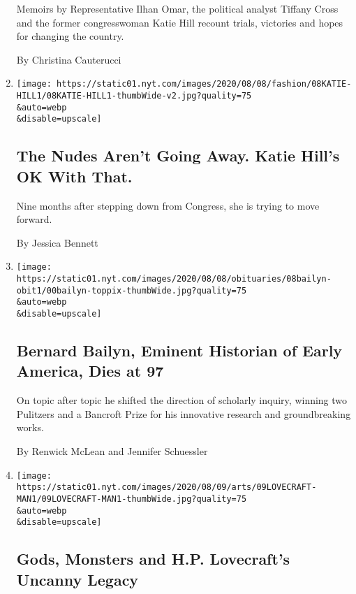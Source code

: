 \begin{enumerate}
  Memoirs by Representative Ilhan Omar, the political analyst Tiffany
  Cross and the former congresswoman Katie Hill recount trials,
  victories and hopes for changing the country.

  By Christina Cauterucci
\item
  \href{/2020/08/08/style/katie-hill-she-will-rise-revenge-porn.html}{}

  \texttt{[image: https://static01.nyt.com/images/2020/08/08/fashion/08KATIE-HILL1/08KATIE-HILL1-thumbWide-v2.jpg?quality=75\\\&auto=webp\\\&disable=upscale]}

  \hypertarget{the-nudes-arent-going-away-katie-hills-ok-with-that}{%
  \subsection{The Nudes Aren't Going Away. Katie Hill's OK With
  That.}\label{the-nudes-arent-going-away-katie-hills-ok-with-that}}

  Nine months after stepping down from Congress, she is trying to move
  forward.

  By Jessica Bennett
\item
  \href{/2020/08/07/books/bernard-bailyn-dead.html}{}

  \texttt{[image: https://static01.nyt.com/images/2020/08/08/obituaries/08bailyn-obit1/00bailyn-toppix-thumbWide.jpg?quality=75\\\&auto=webp\\\&disable=upscale]}

  \hypertarget{bernard-bailyn-eminent-historian-of-early-america-dies-at-97}{%
  \subsection{Bernard Bailyn, Eminent Historian of Early America, Dies
  at
  97}\label{bernard-bailyn-eminent-historian-of-early-america-dies-at-97}}

  On topic after topic he shifted the direction of scholarly inquiry,
  winning two Pulitzers and a Bancroft Prize for his innovative research
  and groundbreaking works.

  By Renwick McLean and Jennifer Schuessler
\item
  \href{/2020/08/07/arts/television/hp-lovecraft.html}{}

  \texttt{[image: https://static01.nyt.com/images/2020/08/09/arts/09LOVECRAFT-MAN1/09LOVECRAFT-MAN1-thumbWide.jpg?quality=75\\\&auto=webp\\\&disable=upscale]}

  \hypertarget{gods-monsters-and-hp-lovecrafts-uncanny-legacy}{%
  \subsection{Gods, Monsters and H.P. Lovecraft's Uncanny
  Legacy}\label{gods-monsters-and-hp-lovecrafts-uncanny-legacy}}


\end{enumerate}
